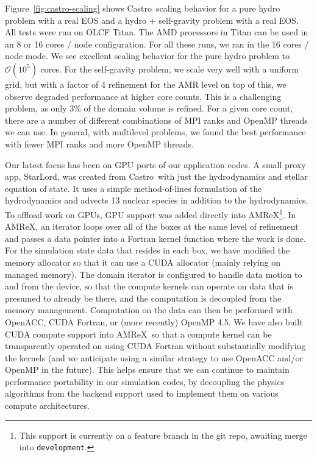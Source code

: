 \documentclass[a4paper]{jpconf}
\newcommand{\castro}{{\sffamily Castro}}
\newcommand{\starlord}{{\sffamily StarLord}}
\newcommand{\amrex}{{\sffamily AMReX}}
\begin{document}
Figure~\ref{fig:castro-scaling} shows \castro\ scaling behavior for a
pure hydro problem with a real EOS and a hydro + self-gravity problem
with a real EOS.  All tests were run on OLCF Titan.  The AMD
processors in Titan can be used in an 8 or 16 cores / node
configuration.  For all these runs, we ran in the 16 cores / node
mode.  We see excellent scaling behavior for the pure hydro problem to
$\mathcal{O}(10^5)$ cores.  For the self-gravity problem, we scale
very well with a uniform grid, but with a factor of 4 refinement for
the AMR level on top of this, we observe degraded performance at
higher core counts.  This is a challenging problem, as only 3\% of the
domain volume is refined.  For a given core count, there are a number
of different combinations of MPI ranks and OpenMP threads we can use.
In general, with multilevel problems, we found the best performance
with fewer MPI ranks and more OpenMP threads.

Our latest focus has been on GPU ports of our application codes.  A
small proxy app, \starlord, was created from \castro\ with just the
hydrodynamics and stellar equation of state.  It uses a simple
method-of-lines formulation of the hydrodynamics and advects 13
nuclear species in addition to the hydrodynamics.  To offload work on
GPUs, GPU support was added directly into \amrex\footnote{This support
  is currently on a feature branch in the git repo, awaiting merge
  into {\tt development}.}.  In \amrex, an iterator loops over all of
the boxes at the same level of refinement and passes a data pointer
into a Fortran kernel function where the work is done. For the
simulation state data that resides in each box, we have modified the
memory allocator so that it can use a CUDA allocator (mainly relying on
managed memory).  The domain iterator is configured to handle data
motion to and from the device, so that the compute kernels can operate
on data that is presumed to already be there, and the computation is
decoupled from the memory management. Computation on the data can then
be performed with OpenACC, CUDA Fortran, or (more recently) OpenMP
4.5. We have also built CUDA compute support into \amrex\ so that a
compute kernel can be transparently operated on using CUDA Fortran
without substantially modifying the kernels (and we anticipate using a
similar strategy to use OpenACC and/or OpenMP in the future). This
helps ensure that we can continue to maintain performance portability
in our simulation codes, by decoupling the physics algorithms from the
backend support used to implement them on various compute
architectures.
\end{document}
